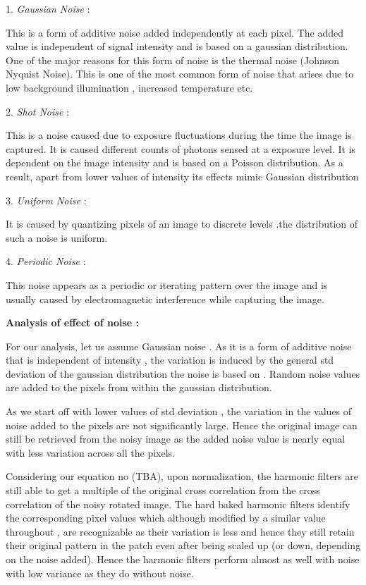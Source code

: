 \documentclass{article}
\begin{document}
1.	\emph{Gaussian Noise} : 

This is a form of additive noise added independently at each pixel. The added value is independent of signal intensity and is based on a gaussian distribution. One of the major reasons for this form of noise is the thermal noise (Johnson Nyquist Noise). This is one of the most common form of noise that arises due to low background illumination , increased temperature etc.

2.	\emph{Shot Noise} :

This is a noise caused due to exposure fluctuations during the time the image is captured. It is caused different counts of photons sensed at a exposure level. It is dependent on the image intensity and is based on a Poisson distribution. As a result, apart from lower values of intensity its effects mimic Gaussian distribution

3.	\emph{Uniform Noise} : 

It is caused by quantizing pixels of an image to discrete levels .the distribution of such a noise is uniform.

4.	\emph{Periodic Noise} :

This noise appears as a periodic or iterating pattern over the image and is usually caused by electromagnetic interference while capturing the image.

\textbf{Analysis of effect of noise : }

For our analysis, let us assume Gaussian noise . As it is a form of additive noise that is independent of intensity , the variation is induced by the general std deviation of the gaussian distribution the noise is based on . Random noise values are added to the pixels from within the gaussian distribution. 

As we start off with lower values of std deviation , the variation in the values of noise added to the pixels are not significantly large. Hence the original image can still be retrieved from the noisy image as the added noise value is nearly equal with less variation across all the pixels. 

Considering our equation no (TBA), upon normalization, the harmonic filters are still able to get a multiple of the original cross correlation from the cross correlation of the noisy rotated image. The hard baked harmonic filters identify the corresponding pixel values  which although modified by a similar value throughout , are recognizable as their variation is less and hence they still retain their original pattern in the patch even after being scaled up (or down, depending on the noise added). Hence the harmonic filters perform almost as well with noise with low variance as they do without noise.
\end{document}
